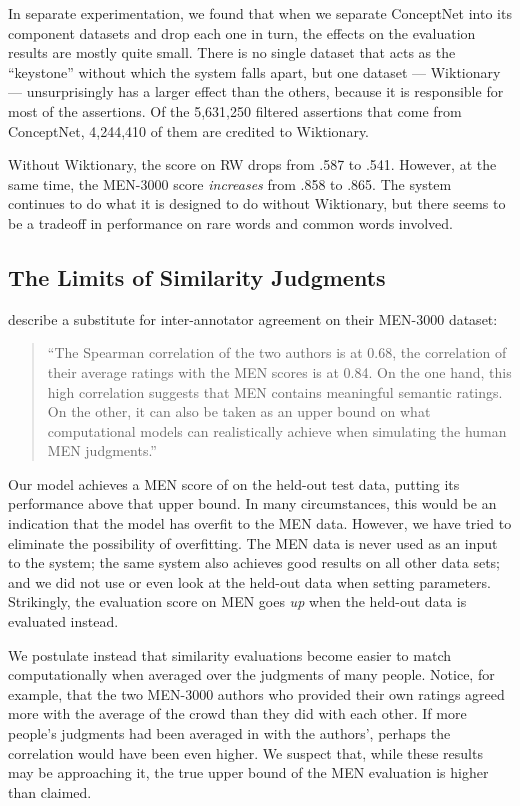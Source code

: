 \documentclass[11pt,letterpaper]{article}
\begin{document}
In separate experimentation, we found that when we separate ConceptNet into its
component datasets and drop each one in turn, the effects on the evaluation
results are mostly quite small. There is no single dataset that acts as the
``keystone'' without which the system falls apart, but one dataset ---
Wiktionary --- unsurprisingly has a larger effect than the others, because it
is responsible for most of the assertions. Of the 5,631,250 filtered assertions
that come from ConceptNet, 4,244,410 of them are credited to Wiktionary.

Without Wiktionary, the score on RW drops from .587 to .541. However, at the
same time, the MEN-3000 score {\em increases} from .858 to .865. The system
continues to do what it is designed to do without Wiktionary, but there seems to
be a tradeoff in performance on rare words and common words involved.

\subsection{The Limits of Similarity Judgments}

 describe a substitute for inter-annotator agreement on
their MEN-3000 dataset:

\begin{quote}
``The Spearman correlation of the two authors is at 0.68, the correlation of their
average ratings with the MEN scores is at 0.84. On the one hand, this high
correlation suggests that MEN contains meaningful semantic ratings. On the
other, it can also be taken as an upper bound on what computational models can
realistically achieve when simulating the human MEN judgments.''
\end{quote}

Our model achieves a MEN score of \scoreMEN{} on the
held-out test data, putting its performance above that upper bound. In many
circumstances, this would be an indication that the model has overfit to the
MEN data. However, we have tried to eliminate the possibility of overfitting.
The MEN data is never used as an input to the system; the same system also
achieves good results on all other data sets; and we did not use or even
look at the held-out data when setting parameters. Strikingly, the evaluation
score on MEN goes {\em up} when the held-out data is evaluated instead.

We postulate instead that similarity evaluations become easier to match
computationally when averaged over the judgments of many people. Notice, for
example, that the two MEN-3000 authors who provided their own ratings
agreed more with the average of the crowd than they did with each other.
If more people's judgments had been averaged in with the authors', perhaps the
correlation would have been even higher. We suspect that, while these results
may be approaching it, the true upper bound of the MEN evaluation is higher than
claimed.
\end{document}
